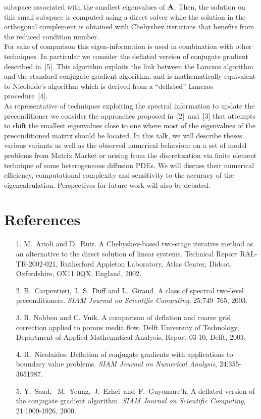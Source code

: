 \documentclass{report}
\begin{document}
subspace associated with the smallest eigenvalues of ${\bf A}$.
Then, the solution on this small subspace is computed using a direct
solver while the solution in the orthogonal complement is obtained with
Chebyshev iterations that benefits from the reduced condition number.\\
For sake of comparison this eigen-information is used in combination with
other techniques.
In particular we consider the deflated version of conjugate gradient described in~[5].
This algorithm exploits the link between the Lanczos algorithm and the
standard conjugate gradient algorithm, and is mathematically equivalent
to Nicolaide's algorithm which is derived from a ``deflated'' Lanczos
procedure~[4].\\
As representative of techniques exploiting the spectral information to
update the preconditioner we consider the approaches proposed
in~[2]~and~[3] that attempts to shift the smallest eigenvalues close to
one where most of the eigenvalues of the preconditioned matrix should be
located.
In this talk, we will describe theses various variants as well as the
observed numerical behaviour on a set of model problems from Matrix
Market or arising from the discretization via finite element technique of
some heterogeneous diffusion PDEs.
We will discuss their numerical efficiency, computational complexity and
sensitivity to the accuracy of the eigencalculation.
Perspectives for future work will also be debated.
\section*{References}
\begin{itemize}
\item[1.]
M.~Arioli and D.~Ruiz.
A {C}hebyshev-based two-stage iterative method as an alternative to the
direct solution of linear systems.
Technical Report RAL-TR-2002-021, Rutherford Appleton Laboratory, Atlas
Center, Didcot, Oxfordshire, OX11 0QX, England, 2002.

\item[2.]
B.~Carpentieri,~I.~S.~Duff and L.~Giraud.
A class of spectral two-level preconditioners.
{\em SIAM {J}ournal on {S}cientific {C}omputing}, 25:{749--765}, 2003.

\item[3.]
R. Nabben and C. Vuik.
A comparison of deflation and coarse grid correction applied to porous media flow.
{Delft University of Technology, Department of Applied Mathematical
Analysis}, {Report 03-10}, {Delft}, 2003.

\item[4.]
R.~Nicolaides.
Deflation of conjugate gradients with applications to boundary value
problems. {\em SIAM Journal on Numerical Analysis}, 24:{355-365}1987.

\item[5.]
{Y.~Saad,~ M.~Yeung,~J.~Erhel~and~F.~Guyomarc'h}.
{A deflated version of the conjugate gradient algorithm}.
{\em SIAM Journal on Scientific Computing}, 21:{1909-1926}, 2000.
\end{itemize}
\end{document}

